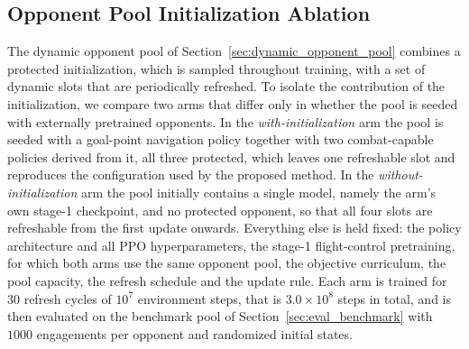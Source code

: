 \subsection{Opponent Pool Initialization Ablation}
\label{sec:init_ablation}

The dynamic opponent pool of Section~\ref{sec:dynamic_opponent_pool} combines a protected initialization, which is sampled throughout training, with a set of dynamic slots that are periodically refreshed. To isolate the contribution of the initialization, we compare two arms that differ only in whether the pool is seeded with externally pretrained opponents. In the \emph{with-initialization} arm the pool is seeded with a goal-point navigation policy together with two combat-capable policies derived from it, all three protected, which leaves one refreshable slot and reproduces the configuration used by the proposed method. In the \emph{without-initialization} arm the pool initially contains a single model, namely the arm's own stage-1 checkpoint, and no protected opponent, so that all four slots are refreshable from the first update onwards. Everything else is held fixed: the policy architecture and all PPO hyperparameters, the stage-1 flight-control pretraining, for which both arms use the same opponent pool, the objective curriculum, the pool capacity, the refresh schedule and the update rule. Each arm is trained for $30$ refresh cycles of $10^7$ environment steps, that is $3.0\times10^8$ steps in total, and is then evaluated on the benchmark pool of Section~\ref{sec:eval_benchmark} with $1000$ engagements per opponent and randomized initial states.

